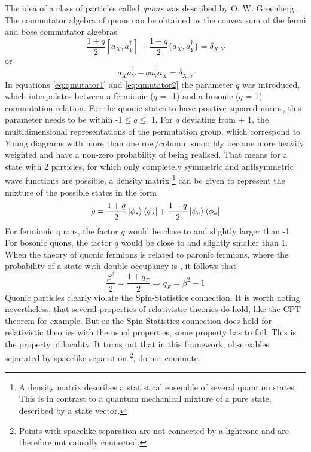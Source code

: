 The idea of a class of particles called \textit{quons} was described by O. W. Greenberg \cite{Greenberg1991}.  The commutator algebra of quons can be obtained as the convex sum of the fermi and bose commutator algebras
\begin{equation}
\label{eq:qmutator1}
 \frac{1+q}{2}[a_{X},a_{Y}^{\dag}]+\frac{1-q}{2}\{a_{X},a_{Y}^{\dag}\} = \delta_{X,Y}
\end{equation} 
or 
\begin{equation}
\label{eq:qmutator2}
 a_{X}a_{Y}^{\dag} - q a_{Y}^{\dag} a_{X} = \delta_{X,Y}
\end{equation} 
In equations \ref{eq:qmutator1} and \ref{eq:qmutator2} the parameter $q$ was introduced, which interpolates between a fermionic ($q$ = -1) and a bosonic ($q$ = 1) commutation relation. For the quonic states to have positive squared norms, this parameter needs to be within -1$\leq q \leq$ 1. For $q$ deviating from $\pm$ 1, the multidimensional representations of the permutation group, which correspond to Young diagrams with more than one row/column, smoothly become more heavily weighted and have a non-zero probability of being realised. That means for a state with 2 particles, for which only completely symmetric and antisymmetric wave functions are possible, a density matrix \footnote{A density matrix describes a statistical ensemble of several quantum states. This is in contrast to a quantum mechanical mixture of a pure state, described by a state vector.} can be given to represent the mixture of the possible states in the form
\begin{equation}
 \rho = \frac{1+q}{2}\ket{\phi_{s}}\bra{\phi_{s}} + \frac{1-q}{2}\ket{\phi_{a}}\bra{\phi_{a}}
\end{equation} 
For fermionic quons, the factor $q$ would be close to and slightly larger than -1. For bosonic quons, the factor $q$ would be close to and slightly smaller than 1. When the theory of quonic fermions is related to paronic fermions, where the probability of a state with double occupancy is \betatwo, it follows that
\begin{equation}
 \frac{\beta^{2}}{2} = \frac{1+q_{F}}{2} \Rightarrow q_{F} = \beta^{2} - 1
\end{equation} 
Quonic particles clearly violate the Spin-Statistics connection. It is worth noting nevertheless, that several properties of relativistic theories do hold, like the CPT theorem for example. But as the Spin-Statistics connection does hold for relativistic theories with the usual properties, some property has to fail. This is the property of locality. It turns out that in this framework, observables separated by spacelike separation \footnote{Points with spacelike separation are not connected by a lightcone and are therefore not causally connected.}, do not commute.


